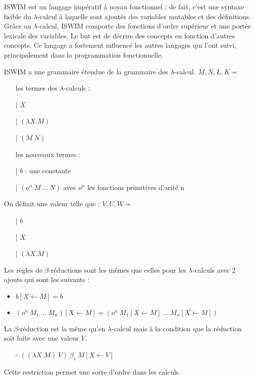 \documentclass[10pt,a4paper]{report}
\begin{document}
ISWIM est un langage impératif à noyau fonctionnel ; de fait, c'est une syntaxe  lisible du $\lambda$-calcul à laquelle sont ajoutés des variables mutables et des définitions. Grâce au $\lambda$-calcul, ISWIM comporte des fonctions d'ordre supérieur et une portée lexicale des variables. Le but est de décrire des concepts en fonction d'autres concepts. Ce langage a fortement influencé les autres langages qui l'ont suivi, principalement dans la programmation fonctionnelle.
\medbreak

ISWIM a une grammaire étendue de la grammaire des $\lambda$-calcul.
\smallbreak
$M,N,L,K =$
\begin{itemize}
\item[ ] les termes des $\lambda$-calculs :
\item[|] $X$ 
\item[|] $(\lambda X.M)$
\item[|] $(M~N)$
\item[ ] les nouveaux termes :
\item[|] $b$ : une constante
\item[|] $(o^{n}~M~...~N)$ avec $o^{n}$ les fonctions primitives d'arité n
\end{itemize}
\medbreak

On définit une valeur telle que :
\smallbreak
$V,U,W =$
\begin{itemize}
\item[|] $b$
\item[|] $X$
\item[|] $(\lambda X.M)$
\end{itemize}
\bigbreak


Les règles de $\beta$-réductions sont les mêmes que celles pour les $\lambda$-calculs avec 2 ajouts qui sont les suivants :
\begin{itemize}
\item $b[X \longleftarrow M] = b$
\item $(o^{n}~M_{1}~...~M_{n})[X \longleftarrow M] = (o^{n}~M_{1}[X \longleftarrow M]~...~M_{n}[X \longleftarrow M])$
\end{itemize}
\bigbreak


La $\beta$-réduction est la même qu'en $\lambda$-calcul mais à la condition que la réduction soit faite avec une valeur $V$. 
\begin{itemize}
\item[-] $((\lambda X.M)~V)~\beta_{v}~M[X \longleftarrow V]$
\end{itemize} 
\smallbreak
Cette restriction permet une sorte d'ordre dans les calculs.
\medbreak
\end{document}

